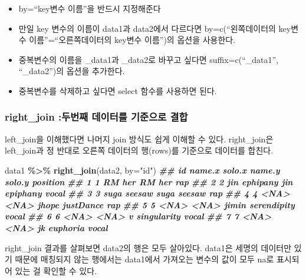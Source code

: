 \documentclass[
]{book}
\newenvironment{Shaded}{\begin{snugshade}}{\end{snugshade}}
\newcommand{\AttributeTok}[1]{\textcolor[rgb]{0.13,0.29,0.53}{#1}}
\newcommand{\DocumentationTok}[1]{\textcolor[rgb]{0.56,0.35,0.01}{\textbf{\textit{#1}}}}
\newcommand{\FunctionTok}[1]{\textcolor[rgb]{0.13,0.29,0.53}{\textbf{#1}}}
\newcommand{\NormalTok}[1]{#1}
\newcommand{\SpecialCharTok}[1]{\textcolor[rgb]{0.81,0.36,0.00}{\textbf{#1}}}
\newcommand{\StringTok}[1]{\textcolor[rgb]{0.31,0.60,0.02}{#1}}
\providecommand{\tightlist}{%
  \setlength{\itemsep}{0pt}\setlength{\parskip}{0pt}}
\begin{document}
\begin{itemize}
\tightlist
\item
  by=``key변수 이름''을 반드시 지정해준다
\item
  만일 key 변수의 이름이 data1과 data2에서 다르다면 by=c(``왼쪽데이터의 key변수 이름''=``오른쪽데이터의 key변수 이름'')의 옵션을 사용한다.
\item
  중복변수의 이름을 \_data1과 \_data2로 바꾸고 싶다면 suffix=c(``\_data1'', ``\_data2'')의 옵션을 추가한다.
\item
  중복변수를 삭제하고 싶다면 select 함수를 사용하면 된다.
\end{itemize}

\subsubsection{right\_join :두번째 데이터를 기준으로 결합}\label{right_join-uxb450uxbc88uxc9f8-uxb370uxc774uxd130uxb97c-uxae30uxc900uxc73cuxb85c-uxacb0uxd569}

left\_join을 이해했다면 나머지 join 방식도 쉽게 이해할 수 있다. right\_join은 left\_join과 정 반대로 오른쪽 데이터의 행(rows)를 기준으로 데이터를 합친다.

\begin{Shaded}
\begin{Highlighting}[]
\NormalTok{data1 }\SpecialCharTok{\%\textgreater{}\%} 
  \FunctionTok{right\_join}\NormalTok{(data2, }\AttributeTok{by=}\StringTok{"id"}\NormalTok{)}
\DocumentationTok{\#\#   id name.x   solo.x name.y      solo.y position}
\DocumentationTok{\#\# 1  1     RM      her     RM         her      rap}
\DocumentationTok{\#\# 2  2    jin ephipany    jin    epiphany    vocal}
\DocumentationTok{\#\# 3  3   suga   seesaw   suga      seesaw      rap}
\DocumentationTok{\#\# 4  4   \textless{}NA\textgreater{}     \textless{}NA\textgreater{}  jhope   justDance      rap}
\DocumentationTok{\#\# 5  5   \textless{}NA\textgreater{}     \textless{}NA\textgreater{}  jimin serendipity    vocal}
\DocumentationTok{\#\# 6  6   \textless{}NA\textgreater{}     \textless{}NA\textgreater{}      v singularity    vocal}
\DocumentationTok{\#\# 7  7   \textless{}NA\textgreater{}     \textless{}NA\textgreater{}     jk    euphoria    vocal}
\end{Highlighting}
\end{Shaded}

right\_join 결과를 살펴보면 data2의 행은 모두 살아있다. data1은 세명의 데이터만 있기 때문에 매칭되지 않는 행에서는 data1에서 가져오는 변수의 값이 모두 na로 표시되어 있는 걸 확인할 수 있다.
\end{document}
